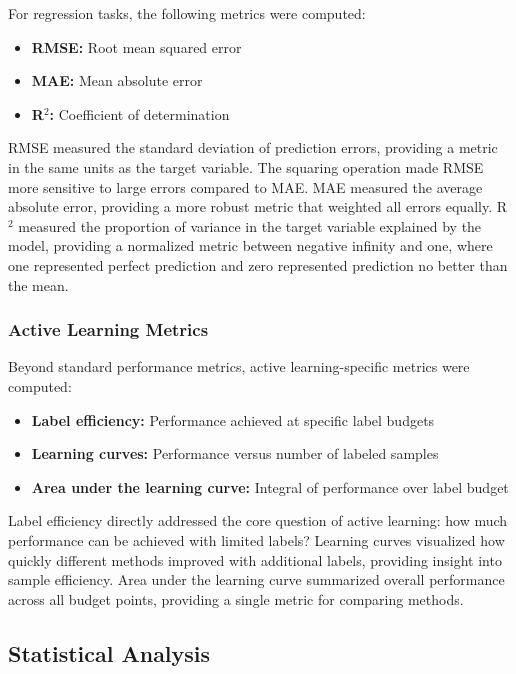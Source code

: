 \documentclass[conference]{IEEEtran}
\begin{document}
For regression tasks, the following metrics were computed:

\begin{itemize}
\item \textbf{RMSE:} Root mean squared error
\item \textbf{MAE:} Mean absolute error
\item \textbf{R$^2$:} Coefficient of determination
\end{itemize}

RMSE measured the standard deviation of prediction errors, providing a metric in the same units as the target variable. The squaring operation made RMSE more sensitive to large errors compared to MAE. MAE measured the average absolute error, providing a more robust metric that weighted all errors equally. R$^2$ measured the proportion of variance in the target variable explained by the model, providing a normalized metric between negative infinity and one, where one represented perfect prediction and zero represented prediction no better than the mean.

\subsubsection{Active Learning Metrics}

Beyond standard performance metrics, active learning-specific metrics were computed:

\begin{itemize}
\item \textbf{Label efficiency:} Performance achieved at specific label budgets
\item \textbf{Learning curves:} Performance versus number of labeled samples
\item \textbf{Area under the learning curve:} Integral of performance over label budget
\end{itemize}

Label efficiency directly addressed the core question of active learning: how much performance can be achieved with limited labels? Learning curves visualized how quickly different methods improved with additional labels, providing insight into sample efficiency. Area under the learning curve summarized overall performance across all budget points, providing a single metric for comparing methods.

\subsection{Statistical Analysis}
\end{document}
